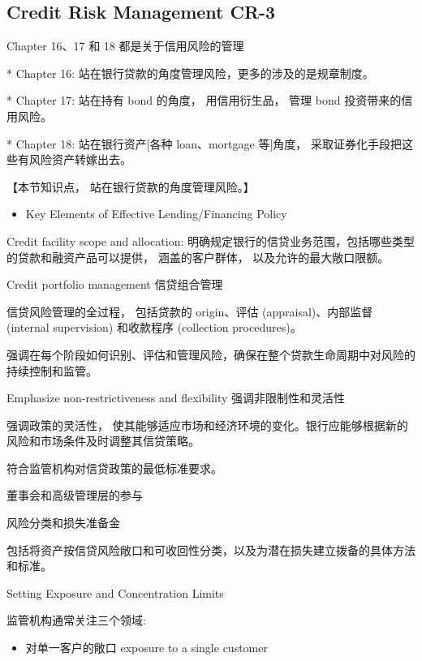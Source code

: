 \subsection{Credit Risk Management CR-3}






Chapter 16、17 和 18 都是关于信用风险的管理

* Chapter 16: 站在银行贷款的角度管理风险，更多的涉及的是规章制度。

* Chapter 17: 站在持有 bond 的角度， 用信用衍生品， 管理 bond 投资带来的信用风险。

* Chapter 18: 站在银行资产[各种 loan、mortgage 等]角度， 采取证券化手段把这些有风险资产转嫁出去。

【本节知识点， 站在银行贷款的角度管理风险。】

\begin{itemize}
\item Key Elements of Effective Lending/Financing Policy
\end{itemize}

 Credit facility scope and allocation: 明确规定银行的信贷业务范围，包括哪些类型的贷款和融资产品可以提供， 涵盖的客户群体， 以及允许的最大敞口限额。

Credit portfolio management 信贷组合管理

信贷风险管理的全过程， 包括贷款的 origin、评估 (appraisal)、内部监督 (internal supervision) 和收款程序 (collection procedures)。

强调在每个阶段如何识别、评估和管理风险，确保在整个贷款生命周期中对风险的持续控制和监管。

Emphasize non-restrictiveness and flexibility 强调非限制性和灵活性

强调政策的灵活性， 使其能够适应市场和经济环境的变化。银行应能够根据新的风险和市场条件及时调整其信贷策略。

 符合监管机构对信贷政策的最低标准要求。

 董事会和高级管理层的参与

 风险分类和损失准备金

包括将资产按信贷风险敞口和可收回性分类，以及为潜在损失建立拨备的具体方法和标准。

Setting Exposure and Concentration Limits

监管机构通常关注三个领域:

\begin{itemize}
\item 对单一客户的敞口 exposure to a single customer
\end{itemize}

